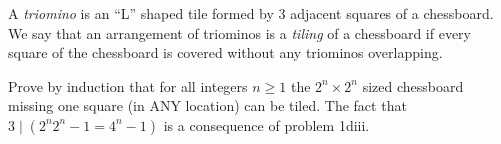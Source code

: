 A \textit{triomino} is an ``L'' shaped tile formed by 3 adjacent squares of a chessboard. We say that an arrangement of triominos is a \textit{tiling} of a chessboard if every square of the chessboard is covered without any triominos overlapping.

Prove by induction that for all integers $n \geq 1$ the $2^n \times 2^n$ sized chessboard missing one square (in ANY location) can be tiled. The fact that $3 \mid (2^n2^n - 1 = 4^n - 1)$ is a consequence of problem 1diii.